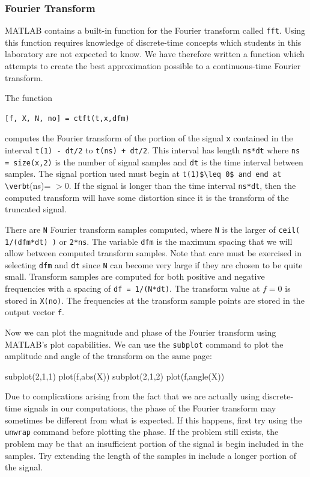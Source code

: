 \subsubsection{Fourier Transform}
MATLAB contains  a built-in function for the Fourier transform called \verb=fft=.  Using this function requires knowledge of discrete-time concepts which students in this laboratory are not expected to know.  We have therefore written a function which attempts to create the best approximation possible to a continuous-time Fourier transform.
\par
The function
\begin{verbatim}
[f, X, N, no] = ctft(t,x,dfm)
\end{verbatim}
computes the Fourier transform of the portion of the signal \verb=x= contained in the interval \verb=t(1) - dt/2= to \verb=t(ns) + dt/2=.  This interval has length \verb=ns*dt= where \verb#ns = size(x,2)# is the number of signal samples and \verb=dt= is the time interval between samples.  The signal portion used must begin at \verb=t(1)$\leq 0$ and end at \verb=t(ns)= $>0$.  If the signal is longer than the time interval \verb=ns*dt=, then the computed transform will have some distortion since it is the transform of the truncated signal.
\par
There are \verb=N= Fourier transform samples computed, where \verb=N= is the larger of \linebreak[4] \verb=ceil( 1/(dfm*dt) )= or \verb=2*ns=.  The variable \verb=dfm= is the maximum spacing that we will allow between computed transform samples.  Note that care must be exercised in selecting \verb=dfm= and \verb=dt= since \verb=N= can become very large if they are chosen to be quite small.  Transform samples are computed for both positive and negative frequencies with a spacing of \verb#df = 1/(N*dt)#.  The transform value at $f=0$ is stored in \verb=X(no)=.  The frequencies at the transform sample points are stored in the output vector \verb=f=.
\par
Now we can plot the magnitude and phase of the Fourier transform using MATLAB's plot capabilities.  We can use the \verb=subplot= command to plot the amplitude and angle of the transform on the same page:

\begin{codex}
subplot(2,1,1)
plot(f,abs(X))
subplot(2,1,2)
plot(f,angle(X))
\end{codex}

\par
Due to complications arising from the fact that we are actually using discrete-time signals in our computations, the phase of the Fourier transform may sometimes be different from what is expected.  If this happens, first try using the \verb=unwrap= command before plotting the phase.  If the problem still exists, the problem may be that an insufficient portion of the signal is begin included in the samples.  Try extending the length of the samples in include a longer portion of the signal.

